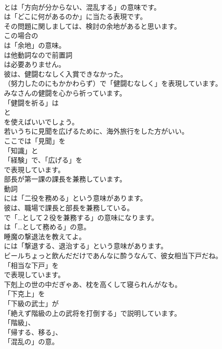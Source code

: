 \documentclass[8pt]{extreport}
\begin{document}
\begin{CJK}{UTF8}{min}
\\	とは「方向が分からない、混乱する」の意味です。
\\	は「どこに何があるのか」に当たる表現です。	
\\	その問題に関しましては、検討の余地があると思います。 
\\	この場合の 
\\	は「余地」の意味。
\\	は他動詞なので前置詞 
\\	は必要ありません。	
\\	彼は、健闘むなしく入賞できなかった。 
\\	（努力したのにもかかわらず）で「健闘むなしく」を表現しています。	
\\	みなさんの健闘を心から祈っています。 
\\	「健闘を祈る」は
\\	と
\\	を使えばいいでしょう。	
\\	若いうちに見聞を広げるために、海外旅行をした方がいい。 
\\	ここでは「見聞」を
\\	「知識」と
\\	「経験」で、「広げる」を
\\	で表現しています。	
\\	部長が第一課の課長を兼務しています。 
\\	動詞
\\	には「二役を務める」という意味があります。	
\\	彼は、職場で課長と部長を兼務している。 
\\	で「…として２役を兼務する」の意味になります。
\\	は「…として務める」の意。	
\\	睡魔の撃退法を教えてよ。 
\\	には「撃退する、退治する」という意味があります。	
\\	ビールちょっと飲んだだけであんなに酔うなんて、彼女相当下戸だね。 
\\	「相当な下戸」を 
\\	で表現しています。	
\\	下剋上の世の中だぎゃあ、枕を高くして寝られんがなも。 
\\	「下克上」を
\\	「下級の武士」が
\\	「絶えず階級の上の武将を打倒する」で説明しています。
\\	「階級」、
\\	「帰する、移る」、
\\	「混乱の」の意。	

\end{CJK}
\end{document}
